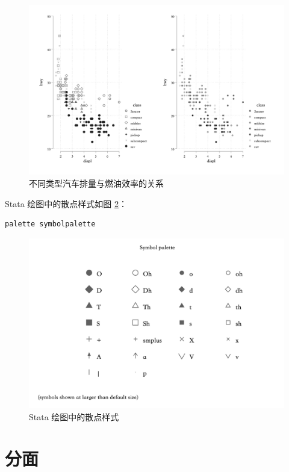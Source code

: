 \begin{figure}[htbp]
  \centering
  \includegraphics[width=\textwidth]{assets/hwydispl6.png}
  \caption{不同类型汽车排量与燃油效率的关系}
  \label{fig:hwydispl6}
\end{figure}

Stata 绘图中的散点样式如图 \ref{fig:symbolpalette}：

\begin{lstlisting}
palette symbolpalette
\end{lstlisting}

\begin{figure}[htbp]
  \centering
  \includegraphics[width=\textwidth]{assets/symbolpalette.png}
  \caption{Stata 绘图中的散点样式}
  \label{fig:symbolpalette}
\end{figure}

\section{分面}

